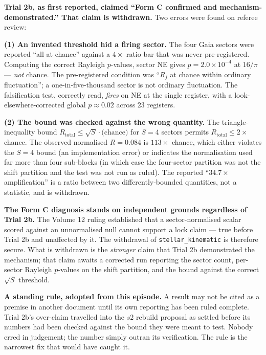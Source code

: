 \documentclass[11pt, letterpaper, openany]{book}
\begin{document}
\begin{correctionbox}
\textbf{Trial 2b, as first reported, claimed ``Form C confirmed and mechanism-demonstrated.''
That claim is withdrawn.} Two errors were found on referee review:

\medskip
\textbf{(1) An invented threshold hid a firing sector.} The four Gaia sectors were reported ``all
at chance'' against a $4\times$ ratio bar that was never pre-registered. Computing the correct
Rayleigh $p$-values, sector NE gives $p = 2.0\times10^{-4}$ at $16/\pi$ --- \emph{not} chance. The
pre-registered condition was ``$R_j$ at chance within ordinary fluctuation''; a one-in-five-thousand
sector is not ordinary fluctuation. The falsification test, correctly read, \emph{fires} on NE at
the single register, with a look-elsewhere-corrected global $p \approx 0.02$ across 23 registers.

\medskip
\textbf{(2) The bound was checked against the wrong quantity.} The triangle-inequality bound
$R_{\mathrm{total}} \leq \sqrt{S}\cdot\text{(chance)}$ for $S=4$ sectors permits
$R_{\mathrm{total}} \leq 2\times$ chance. The observed normalised $R = 0.084$ is $113\times$ chance,
which either violates the $S=4$ bound (an implementation error) or indicates the normalisation used
far more than four sub-blocks (in which case the four-sector partition was not the shift partition
and the test was not run as ruled). The reported ``$34.7\times$ amplification'' is a ratio between
two differently-bounded quantities, not a statistic, and is withdrawn.
\end{correctionbox}

\begin{rulingbox}
\textbf{The Form C diagnosis stands on independent grounds regardless of Trial 2b.} The Volume 12
ruling established that a sector-normalised scalar scored against an unnormalised null cannot
support a lock claim --- true before Trial 2b and unaffected by it. The withdrawal of
\texttt{stellar\_kinematic} is therefore secure. What is withdrawn is the \emph{stronger} claim that
Trial 2b demonstrated the mechanism; that claim awaits a corrected run reporting the sector count,
per-sector Rayleigh $p$-values on the shift partition, and the bound against the correct
$\sqrt{S}$ threshold.
\end{rulingbox}

\begin{warningbox}
\textbf{A standing rule, adopted from this episode.} A result may not be cited as a premise in
another document until its own reporting has been ruled complete. Trial 2b's over-claim travelled
into the $s2$ rebuild proposal as settled before its numbers had been checked against the bound
they were meant to test. Nobody erred in judgement; the number simply outran its verification. The
rule is the narrowest fix that would have caught it.
\end{warningbox}
\end{document}
